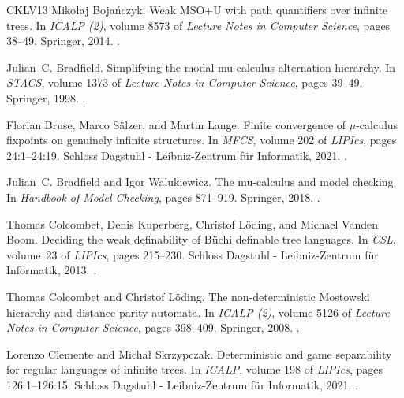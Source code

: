 \documentclass[11pt,a4paper]{amsart}
\theoremstyle{plain}
\theoremstyle{definition}
\theoremstyle{defC}
\theoremstyle{thmC}
\theoremstyle{plain}
\numberwithin{equation}{section}
\numberwithin{equation}{section}
\numberwithin{figure}{section}
\begin{document}
\begin{thebibliography}{CKLV13}
Miko{\l}aj Bojańczyk.
\newblock Weak {MSO+U} with path quantifiers over infinite trees.
\newblock In {\em {ICALP} {(2)}}, volume 8573 of {\em Lecture Notes in Computer
  Science}, pages 38--49. Springer, 2014.
\newblock \href {https://doi.org/10.1007/978-3-662-43951-7_4}
  {}.

Julian~C. Bradfield.
\newblock Simplifying the modal mu-calculus alternation hierarchy.
\newblock In {\em STACS}, volume 1373 of {\em Lecture Notes in Computer
  Science}, pages 39--49. Springer, 1998.
\newblock \href {https://doi.org/10.1007/BFB0028547}
  {}.

Florian Bruse, Marco S\"{a}lzer, and Martin Lange.
\newblock Finite convergence of $\mu$-calculus fixpoints on genuinely infinite
  structures.
\newblock In {\em {MFCS}}, volume 202 of {\em LIPIcs}, pages 24:1--24:19.
  Schloss Dagstuhl - Leibniz-Zentrum f{\"u}r Informatik, 2021.
\newblock \href {https://doi.org/10.4230/LIPIcs.MFCS.2021.24}
  {}.

Julian~C. Bradfield and Igor Walukiewicz.
\newblock The mu-calculus and model checking.
\newblock In {\em Handbook of Model Checking}, pages 871--919. Springer, 2018.
\newblock \href {https://doi.org/10.1007/978-3-319-10575-8_26}
  {}.

Thomas Colcombet, Denis Kuperberg, Christof L{\"{o}}ding, and Michael {Vanden
  Boom}.
\newblock Deciding the weak definability of {B{\"{u}}chi} definable tree
  languages.
\newblock In {\em CSL}, volume~23 of {\em LIPIcs}, pages 215--230. Schloss
  Dagstuhl - Leibniz-Zentrum f{\"{u}}r Informatik, 2013.
\newblock \href {https://doi.org/10.4230/LIPICS.CSL.2013.215}
  {}.

Thomas Colcombet and Christof L{\"{o}}ding.
\newblock The non-deterministic {Mostowski} hierarchy and distance-parity
  automata.
\newblock In {\em ICALP (2)}, volume 5126 of {\em Lecture Notes in Computer
  Science}, pages 398--409. Springer, 2008.
\newblock \href {https://doi.org/10.1007/978-3-540-70583-3_33}
  {}.

Lorenzo Clemente and Micha{\l} Skrzypczak.
\newblock Deterministic and game separability for regular languages of infinite
  trees.
\newblock In {\em ICALP}, volume 198 of {\em LIPIcs}, pages 126:1--126:15.
  Schloss Dagstuhl - Leibniz-Zentrum f{\"{u}}r Informatik, 2021.
\newblock \href {https://doi.org/10.4230/LIPICS.ICALP.2021.126}
  {}.


\end{thebibliography}
\end{document}
